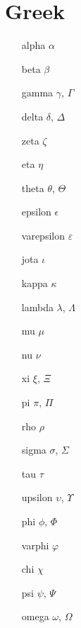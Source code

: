 \documentclass{scrartcl}
\begin{document}
\section{Greek}
\begin{multicols}{3}
\begin{enumerate}[label=\Alph*:]
    \item[alpha] $\alpha$
    \item[beta] $\beta$
    \item[gamma] $\gamma$, $\Gamma$
    \item[delta] $\delta$, $\Delta$
    \item[zeta] $\zeta$
    \item[eta] $\eta$
    \item[theta] $\theta$, $\Theta$
    \item[epsilon] $\epsilon$
    \item[varepsilon] $\varepsilon$
    \item[jota] $\iota$
    \item[kappa] $\kappa$
    \item[lambda] $\lambda$, $\Lambda$
    \item[mu] $\mu$
    \item[nu] $\nu$
    \item[xi] $\xi$, $\Xi$
    \item[pi] $\pi$, $\Pi$
    \item[rho] $\rho$
    \item[sigma] $\sigma$, $\Sigma$
    \item[tau] $\tau$
    \item[upsilon] $\upsilon$, $\Upsilon$
    \item[phi] $\phi$, $\Phi$
    \item[varphi] $\varphi$
    \item[chi] $\chi$
    \item[psi] $\psi$, $\Psi$
    \item[omega] $\omega$, $\Omega$
\end{enumerate}
\end{multicols}
\end{document}
